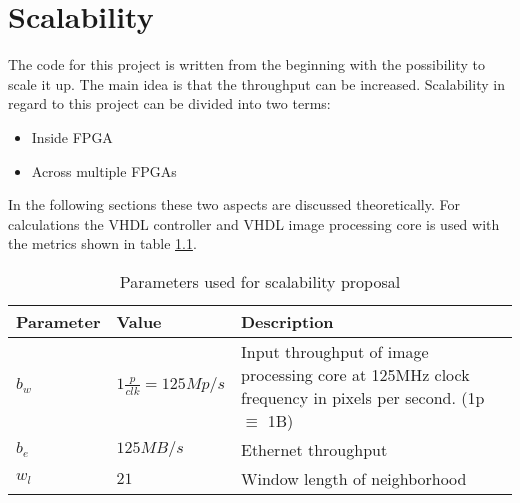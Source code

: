 %
%
\chapter{Scalability} \label{chapt:scalability}
The code for this project is written from the beginning with the possibility to
scale it up. The main idea is that the throughput can be increased.
Scalability in regard to this project can be divided into two terms:
\begin{itemize}
    \item Inside FPGA
    \item Across multiple FPGAs
\end{itemize}

In the following sections these two aspects are discussed theoretically. For
calculations the VHDL controller and VHDL image processing core is used with the
 metrics shown in table \ref{tab:sca:vhdlparams}.

\begin{table}[h!]
    \centering
    \begin{tabular}{l l p{10cm}}
        \toprule
        Parameter & Value & Description \\
        \midrule
        $b_w$  & $1 \frac{p}{clk} = 125 Mp/s$ & Input throughput of image
        processing core at 125MHz clock frequency in pixels per second. (1p
        $\equiv$ 1B) \\
        $b_e$  & $125MB/s$ & Ethernet throughput \\
        $w_l$  & $21$ & Window length of neighborhood \\
        \bottomrule
    \end{tabular}
    \caption{Parameters used for scalability proposal}
    \label{tab:sca:vhdlparams}
\end{table}

